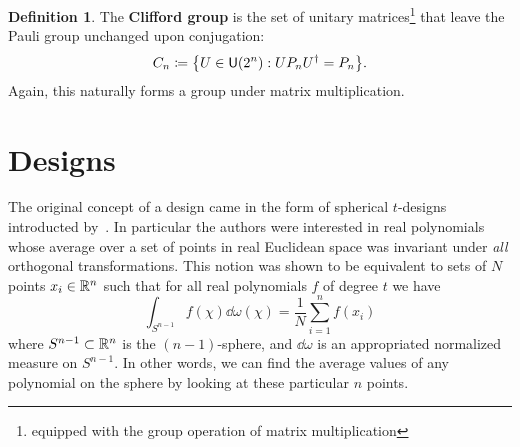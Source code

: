 \documentclass[11pt,english]{article}
\theoremstyle{definition}
\newtheorem{definition}{Definition}[section]
\begin{document}
\begin{definition}
  The \textbf{Clifford group} is the set of unitary matrices\footnote{equipped with the group operation of matrix multiplication} that leave the Pauli group unchanged upon conjugation:
  \begin{equation}
    C_n\coloneqq \qty{U\in\mathsf{U}(2^n) : UP_n U^\dagger = P_n}.
  \end{equation}
  Again, this naturally forms a group under matrix multiplication.
\end{definition}


\section{Designs}

The original concept of a design came in the form of spherical $t$-designs introducted by~\cite{spherical-designs}.
In particular the authors were interested in real polynomials whose average over a set of points in real Euclidean space was invariant under \emph{all} orthogonal transformations.
This notion was shown to be equivalent to sets of $N$ points $x_i\in\mathbb{R}^n$ such that for all real polynomials $f$ of degree $t$ we have
\begin{equation}
  \int_{S^{n-1}} f(\chi)\dd{\omega(\chi)} = \frac{1}{N}\sum_{i = 1}^n f(x_i)
\end{equation}
where $S^{n-1}\subset \mathbb{R}^n$ is the $(n-1)$-sphere, and $\dd{\omega}$ is an appropriated normalized measure on $S^{n-1}$.
In other words, we can find the average values of any polynomial on the sphere by looking at these particular $n$ points.


\nocite{*}

\clearpage


\end{document}
